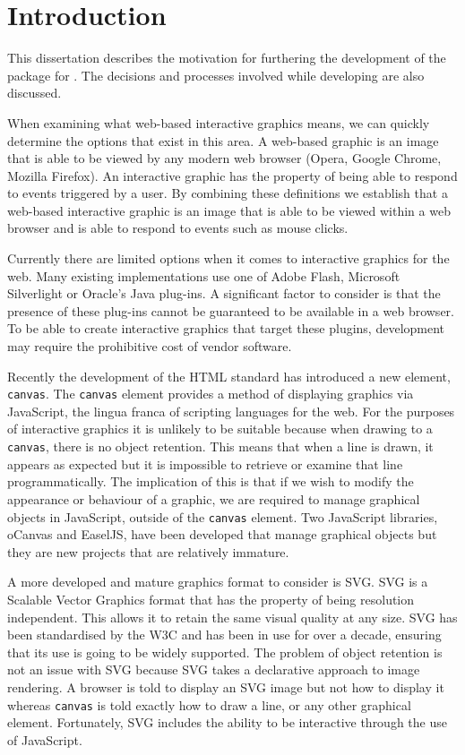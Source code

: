 \section{Introduction}

This dissertation describes the motivation for furthering the development of the \gridSVG{} package for \R{}.
The decisions and processes involved while developing \gridSVG{} are also discussed.

When examining what web-based interactive graphics means, we can quickly determine the options that exist in this area.
A web-based graphic is an image that is able to be viewed by any modern web browser (Opera, Google Chrome, Mozilla Firefox).
An interactive graphic has the property of being able to respond to events triggered by a user.
By combining these definitions we establish that a web-based interactive graphic is an image that is able to be viewed within a web browser and is able to respond to events such as mouse clicks.

Currently there are limited options when it comes to interactive graphics for the web.
Many existing implementations use one of Adobe Flash, Microsoft Silverlight or Oracle's Java plug-ins.
A significant factor to consider is that the presence of these plug-ins cannot be guaranteed to be available in a web browser.
To be able to create interactive graphics that target these plugins, development may require the prohibitive cost of vendor software.

Recently the development of the HTML standard has introduced a new element, \texttt{canvas}.
The \texttt{canvas} element provides a method of displaying graphics via JavaScript, the lingua franca of scripting languages for the web.
For the purposes of interactive graphics it is unlikely to be suitable because when drawing to a \texttt{canvas}, there is no object retention.
This means that when a line is drawn, it appears as expected but it is impossible to retrieve or examine that line programmatically.
The implication of this is that if we wish to modify the appearance or behaviour of a graphic, we are required to manage graphical objects in JavaScript, outside of the \texttt{canvas} element.
Two JavaScript libraries, oCanvas and EaselJS, have been developed that manage graphical objects but they are new projects that are relatively immature. \citep{oCanvas, easelJS}

A more developed and mature graphics format to consider is SVG.
SVG is a Scalable Vector Graphics format that has the property of being resolution independent.
This allows it to retain the same visual quality at any size.
SVG has been standardised by the W3C and has been in use for over a decade, ensuring that its use is going to be widely supported.
The problem of object retention is not an issue with SVG because SVG takes a declarative approach to image rendering.
A browser is told to display an SVG image but not how to display it whereas \texttt{canvas} is told exactly how to draw a line, or any other graphical element.
Fortunately, SVG includes the ability to be interactive through the use of JavaScript.

